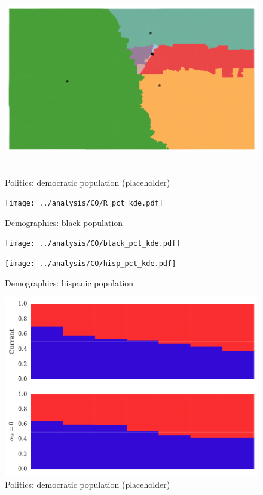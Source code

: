\begin{figure}[htb!]
\includegraphics[width=5in,height=3in,keepaspectratio]{../maps/CO/static/0_25_after.png}
\end{figure}

\clearpage
\newpage

\begin{figure}[htb!] \centering
\caption{ Politics: democratic population (placeholder)}
\texttt{[image: ../analysis/CO/R\_pct\_kde.pdf]}
\caption{ Demographics: black population }
\texttt{[image: ../analysis/CO/black\_pct\_kde.pdf]}
\caption{ Demographics: hispanic population }
\texttt{[image: ../analysis/CO/hisp\_pct\_kde.pdf]}
\end{figure}

\clearpage
\newpage

\begin{figure}[htb!] \centering
\caption{ Politics: democratic population (placeholder)}
\includegraphics[width=6in]{../analysis/CO/barplot.pdf}
\end{figure}

